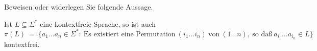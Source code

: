 \begin{exercise}
	
Beweisen oder widerlegen Sie folgende Aussage.

Ist $L \subseteq \Sigma^*$ eine kontextfreie Sprache, so ist auch
$$\pi(L) \ = \ \{a_1 \ldots a_n \in \Sigma^*: \ \mbox{Es existiert eine Permutation} \ (i_1 \ldots i_n) \ \mbox{von} \ (1 \ldots n), \ \mbox{so da{\ss}} \ a_{i_1} \ldots a_{i_n} \in L \} $$
kontextfrei.

\end{exercise}
